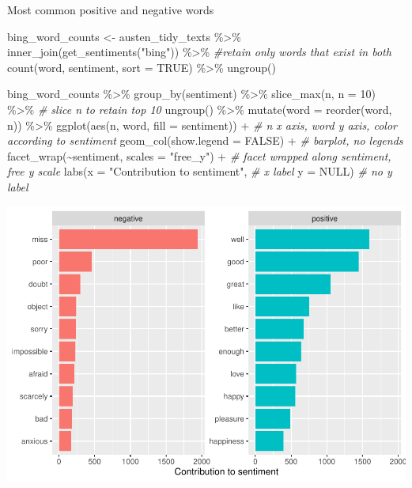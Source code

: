 \documentclass[
]{article}
\newenvironment{Shaded}{\begin{snugshade}}{\end{snugshade}}
\newcommand{\AttributeTok}[1]{\textcolor[rgb]{0.77,0.63,0.00}{#1}}
\newcommand{\CommentTok}[1]{\textcolor[rgb]{0.56,0.35,0.01}{\textit{#1}}}
\newcommand{\ConstantTok}[1]{\textcolor[rgb]{0.00,0.00,0.00}{#1}}
\newcommand{\DecValTok}[1]{\textcolor[rgb]{0.00,0.00,0.81}{#1}}
\newcommand{\FunctionTok}[1]{\textcolor[rgb]{0.00,0.00,0.00}{#1}}
\newcommand{\NormalTok}[1]{#1}
\newcommand{\OtherTok}[1]{\textcolor[rgb]{0.56,0.35,0.01}{#1}}
\newcommand{\SpecialCharTok}[1]{\textcolor[rgb]{0.00,0.00,0.00}{#1}}
\newcommand{\StringTok}[1]{\textcolor[rgb]{0.31,0.60,0.02}{#1}}
\begin{document}
Most common positive and negative words

\begin{Shaded}
\begin{Highlighting}[]
\NormalTok{bing\_word\_counts }\OtherTok{\textless{}{-}}\NormalTok{ austen\_tidy\_texts }\SpecialCharTok{\%\textgreater{}\%}
  \FunctionTok{inner\_join}\NormalTok{(}\FunctionTok{get\_sentiments}\NormalTok{(}\StringTok{"bing"}\NormalTok{)) }\SpecialCharTok{\%\textgreater{}\%} \CommentTok{\#retain only words that exist in both }
  \FunctionTok{count}\NormalTok{(word, sentiment, }\AttributeTok{sort =} \ConstantTok{TRUE}\NormalTok{) }\SpecialCharTok{\%\textgreater{}\%} 
  \FunctionTok{ungroup}\NormalTok{()}

\NormalTok{bing\_word\_counts }\SpecialCharTok{\%\textgreater{}\%}
  \FunctionTok{group\_by}\NormalTok{(sentiment) }\SpecialCharTok{\%\textgreater{}\%}
  \FunctionTok{slice\_max}\NormalTok{(n, }\AttributeTok{n =} \DecValTok{10}\NormalTok{) }\SpecialCharTok{\%\textgreater{}\%}  \CommentTok{\# slice n to retain top 10}
  \FunctionTok{ungroup}\NormalTok{() }\SpecialCharTok{\%\textgreater{}\%}
  \FunctionTok{mutate}\NormalTok{(}\AttributeTok{word =} \FunctionTok{reorder}\NormalTok{(word, n)) }\SpecialCharTok{\%\textgreater{}\%}
  \FunctionTok{ggplot}\NormalTok{(}\FunctionTok{aes}\NormalTok{(n, word, }\AttributeTok{fill =}\NormalTok{ sentiment)) }\SpecialCharTok{+} \CommentTok{\# n x axis, word y axis, color according to sentiment}
  \FunctionTok{geom\_col}\NormalTok{(}\AttributeTok{show.legend =} \ConstantTok{FALSE}\NormalTok{) }\SpecialCharTok{+} \CommentTok{\# barplot, no legends}
  \FunctionTok{facet\_wrap}\NormalTok{(}\SpecialCharTok{\textasciitilde{}}\NormalTok{sentiment, }\AttributeTok{scales =} \StringTok{"free\_y"}\NormalTok{) }\SpecialCharTok{+} \CommentTok{\# facet wrapped along sentiment, free y scale}
  \FunctionTok{labs}\NormalTok{(}\AttributeTok{x =} \StringTok{"Contribution to sentiment"}\NormalTok{, }\CommentTok{\# x label}
       \AttributeTok{y =} \ConstantTok{NULL}\NormalTok{) }\CommentTok{\# no y label}
\end{Highlighting}
\end{Shaded}

\includegraphics{Week8_files/figure-latex/unnamed-chunk-9-1.pdf}
\end{document}
